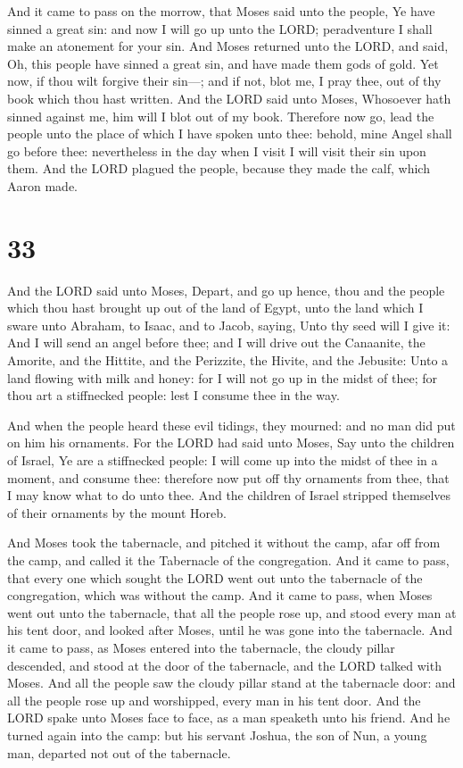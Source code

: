  And it came to pass on the morrow, that Moses said unto
the people, Ye have sinned a great sin: and now I will go up unto the
LORD; peradventure I shall make an atonement for your sin. 
And Moses returned unto the LORD, and said, Oh, this people have sinned
a great sin, and have made them gods of gold.  Yet now, if
thou wilt forgive their sin---; and if not, blot me, I pray thee, out of
thy book which thou hast written.  And the LORD said unto
Moses, Whosoever hath sinned against me, him will I blot out of my book.
 Therefore now go, lead the people unto the place of which
I have spoken unto thee: behold, mine Angel shall go before thee:
nevertheless in the day when I visit I will visit their sin upon them.
 And the LORD plagued the people, because they made the
calf, which Aaron made.

\hypertarget{section-32}{%
\section{33}\label{section-32}}

 And the LORD said unto Moses, Depart, and go up hence, thou
and the people which thou hast brought up out of the land of Egypt, unto
the land which I sware unto Abraham, to Isaac, and to Jacob, saying,
Unto thy seed will I give it:  And I will send an angel
before thee; and I will drive out the Canaanite, the Amorite, and the
Hittite, and the Perizzite, the Hivite, and the Jebusite: 
Unto a land flowing with milk and honey: for I will not go up in the
midst of thee; for thou art a stiffnecked people: lest I consume thee in
the way.

 And when the people heard these evil tidings, they
mourned: and no man did put on him his ornaments.  For the
LORD had said unto Moses, Say unto the children of Israel, Ye are a
stiffnecked people: I will come up into the midst of thee in a moment,
and consume thee: therefore now put off thy ornaments from thee, that I
may know what to do unto thee.  And the children of Israel
stripped themselves of their ornaments by the mount Horeb.

 And Moses took the tabernacle, and pitched it without the
camp, afar off from the camp, and called it the Tabernacle of the
congregation. And it came to pass, that every one which sought the LORD
went out unto the tabernacle of the congregation, which was without the
camp.  And it came to pass, when Moses went out unto the
tabernacle, that all the people rose up, and stood every man at his tent
door, and looked after Moses, until he was gone into the tabernacle.
 And it came to pass, as Moses entered into the tabernacle,
the cloudy pillar descended, and stood at the door of the tabernacle,
and the LORD talked with Moses.  And all the people saw the
cloudy pillar stand at the tabernacle door: and all the people rose up
and worshipped, every man in his tent door.  And the LORD
spake unto Moses face to face, as a man speaketh unto his friend. And he
turned again into the camp: but his servant Joshua, the son of Nun, a
young man, departed not out of the tabernacle.

